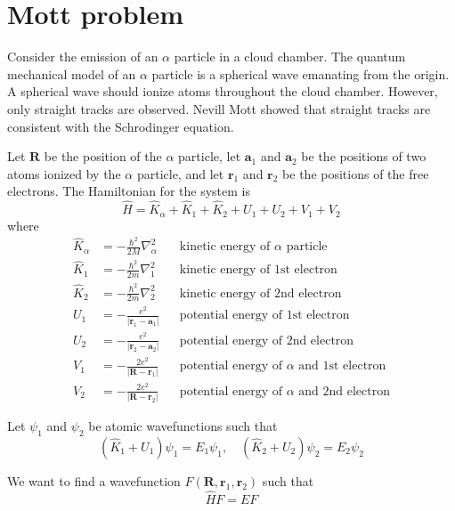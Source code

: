 \documentclass[12pt]{article}
\begin{document}
\section*{Mott problem}

Consider the emission of an $\alpha$ particle in a cloud chamber.
The quantum mechanical model of an $\alpha$ particle is a spherical
wave emanating from the origin.
A spherical wave should ionize atoms throughout the cloud chamber.
However, only straight tracks are observed.
Nevill Mott showed that straight tracks are consistent with the Schrodinger equation.

\bigskip

Let $\mathbf R$ be the position of the $\alpha$ particle,
let $\mathbf a_1$ and $\mathbf a_2$ be the positions of two atoms ionized by the $\alpha$ particle,
and let $\mathbf r_1$ and $\mathbf r_2$ be the positions of the free electrons.
The Hamiltonian for the system is
\begin{equation*}
\hat H=\hat K_\alpha+\hat K_1+\hat K_2+U_1+U_2+V_1+V_2
\end{equation*}
where
\begin{align*}
\hat K_\alpha&=-\frac{\hbar^2}{2M}\nabla_\alpha^2 & & \text{kinetic energy of $\alpha$ particle}
\\[1ex]
\hat K_1&=-\frac{\hbar^2}{2m}\nabla_1^2 & & \text{kinetic energy of 1st electron}
\\[1ex]
\hat K_2&=-\frac{\hbar^2}{2m}\nabla_2^2 & & \text{kinetic energy of 2nd electron}
\\[1ex]
U_1&=-\frac{e^2}{|\mathbf r_1-\mathbf a_1|} & & \text{potential energy of 1st electron}
\\[1ex]
U_2&=-\frac{e^2}{|\mathbf r_2-\mathbf a_2|} & & \text{potential energy of 2nd electron}
\\[1ex]
V_1&=-\frac{2e^2}{|\mathbf R-\mathbf r_1|} & & \text{potential energy of $\alpha$ and 1st electron}
\\[1ex]
V_2&=-\frac{2e^2}{|\mathbf R-\mathbf r_2|} & & \text{potential energy of $\alpha$ and 2nd electron}
\end{align*}

Let $\psi_1$ and $\psi_2$ be atomic wavefunctions such that
\begin{equation*}
\left(\hat K_1+U_1\right)\psi_1=E_1\psi_1,
\quad
\left(\hat K_2+U_2\right)\psi_2=E_2\psi_2
\end{equation*}

We want to find a wavefunction $F(\mathbf R,\mathbf r_1,\mathbf r_2)$ such that
\begin{equation*}
\hat HF=EF
\end{equation*}
\end{document}

